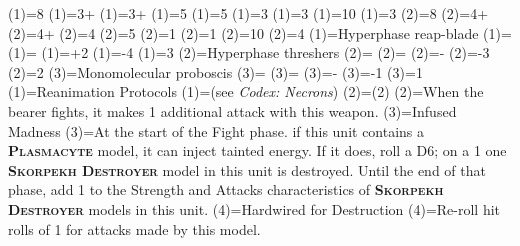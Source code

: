 \renewcommand{\UnitName}{Skorpekh Destroyers}%
\renewcommand{\UnitPower}{7}%
\renewcommand{\UnitIcon}{Elites.svg}%
%
\renewcommand{\StatBlocks}{2}%
\Movement(1)={8}%
\WeaponSkill(1)={3+}%
\BalisticSkill(1)={3+}%
\Strength(1)={5}%
\Toughness(1)={5}%
\Wounds(1)={3}%
\Attacks(1)={3}%
\Leadership(1)={10}%
\Save(1)={3}%
%
\Movement(2)={8}%
\WeaponSkill(2)={4+}%
\BalisticSkill(2)={4+}%
\Strength(2)={4}%
\Toughness(2)={5}%
\Wounds(2)={1}%
\Attacks(2)={1}%
\Leadership(2)={10}%
\Save(2)={4}%
%
\renewcommand{\UnitText}{3 \UnitName\space and 1 Plasmacyte. One Skorpekh Destroyer in this unit is equiped with: \WeaponName(1). Every other Skorpekh Destroyer in this unit is equiped with \WeaponName(2). A Plasmacyte is equiped with \WeaponName(3).}%
%
%
\renewcommand{\NumWeapon}{3}%
\WeaponName(1)={Hyperphase reap-blade}%
\WeaponRange(1)={}%
\WeaponType(1)={}%
\WeaponStrength(1)={+2}%
\WeaponAP(1)={-4}%
\WeaponDamage(1)={3}%
%
\WeaponName(2)={Hyperphase threshers}%
\WeaponRange(2)={}%
\WeaponType(2)={}%
\WeaponStrength(2)={-}%
\WeaponAP(2)={-3}%
\WeaponDamage(2)={2}%
%
\WeaponName(3)={Monomolecular proboscis}%
\WeaponRange(3)={}%
\WeaponType(3)={}%
\WeaponStrength(3)={-}%
\WeaponAP(3)={-1}%
\WeaponDamage(3)={1}%
%
\renewcommand{\NumAbilities}{2}%
\AbilityName(1)={Reanimation Protocols}%
\AbilityDescription(1)={(see \textit{Codex: Necrons})}%
%
\AbilityName(2)={\WeaponName(2)}%
\AbilityDescription(2)={When the bearer fights, it makes 1 additional attack with this weapon.}%
%
\AbilityName(3)={Infused Madness}%
\AbilityDescription(3)={At the start of the Fight phase. if this unit contains a \textsc{\textbf{Plasmacyte}} model, it can inject tainted energy.  If it does, roll a D6; on a 1 one \textsc{\textbf{Skorpekh Destroyer}} model in this unit is destroyed.  Until the end of that phase, add 1 to the Strength and Attacks characteristics of \textsc{\textbf{Skorpekh Destroyer}} models in this unit.}%
%
\AbilityName(4)={Hardwired for Destruction}%
\AbilityDescription(4)={Re-roll hit rolls of 1 for attacks made by this model.}%
%
\renewcommand{\FactionKeywords}{Necrons, Destroyer Cult, <Dynasty>}%
\renewcommand{\Keywords}{Infantry, \UnitName, Plasmacyte}%
\newcommand{\ExtraFrontTitle}{\AbilityName(4)}%
\renewcommand{\ExtraFrontText}{\AbilityDescription(4)}%
\newcommand{\ExtraBackTitle}{\AbilityName(3)}%
\renewcommand{\ExtraBackText}{\AbilityDescription(3)}%
\endinput%